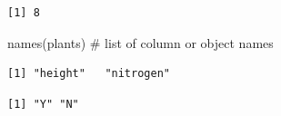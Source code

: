 \documentclass[
  letterpaper,
  DIV=11,
  numbers=noendperiod]{scrartcl}
\newenvironment{Shaded}{\begin{snugshade}}{\end{snugshade}}
\newcommand{\CommentTok}[1]{\textcolor[rgb]{0.37,0.37,0.37}{#1}}
\newcommand{\FunctionTok}[1]{\textcolor[rgb]{0.28,0.35,0.67}{#1}}
\newcommand{\NormalTok}[1]{\textcolor[rgb]{0.00,0.23,0.31}{#1}}
\newcommand{\SpecialCharTok}[1]{\textcolor[rgb]{0.37,0.37,0.37}{#1}}
\begin{document}
\begin{verbatim}
[1] 8
\end{verbatim}

\begin{Shaded}
\begin{Highlighting}[]
\FunctionTok{names}\NormalTok{(plants) }\CommentTok{\# list of column or object names}
\end{Highlighting}
\end{Shaded}

\begin{verbatim}
[1] "height"   "nitrogen"
\end{verbatim}

\begin{Shaded}
\end{Shaded}

\begin{verbatim}
[1] "Y" "N"
\end{verbatim}
\end{document}
